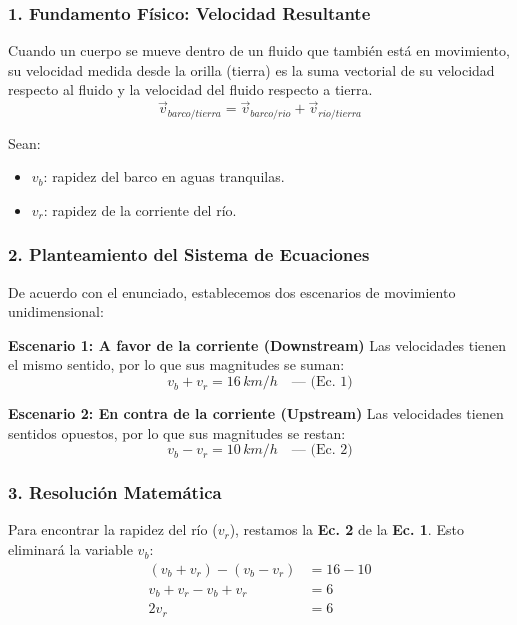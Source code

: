 \documentclass[12pt, a4paper]{article}
\begin{document}
\subsubsection*{1. Fundamento Físico: Velocidad Resultante}

Cuando un cuerpo se mueve dentro de un fluido que también está en movimiento, su velocidad medida desde la orilla (tierra) es la suma vectorial de su velocidad respecto al fluido y la velocidad del fluido respecto a tierra.
\begin{equation}
    \vec{v}_{barco/tierra} = \vec{v}_{barco/rio} + \vec{v}_{rio/tierra}
\end{equation}

Sean:
\begin{itemize}
    \item $v_b$: rapidez del barco en aguas tranquilas.
    \item $v_r$: rapidez de la corriente del río.
\end{itemize}

\subsubsection*{2. Planteamiento del Sistema de Ecuaciones}

De acuerdo con el enunciado, establecemos dos escenarios de movimiento unidimensional:

\textbf{Escenario 1: A favor de la corriente (Downstream)}
Las velocidades tienen el mismo sentido, por lo que sus magnitudes se suman:
\begin{equation}
    v_b + v_r = 16 \, \si{km/h} \quad \text{--- (Ec. 1)}
\end{equation}

\textbf{Escenario 2: En contra de la corriente (Upstream)}
Las velocidades tienen sentidos opuestos, por lo que sus magnitudes se restan:
\begin{equation}
    v_b - v_r = 10 \, \si{km/h} \quad \text{--- (Ec. 2)}
\end{equation}

\subsubsection*{3. Resolución Matemática}

Para encontrar la rapidez del río ($v_r$), restamos la \textbf{Ec. 2} de la \textbf{Ec. 1}. Esto eliminará la variable $v_b$:
\begin{align*}
    (v_b + v_r) - (v_b - v_r) &= 16 - 10 \\
    v_b + v_r - v_b + v_r &= 6 \\
    2v_r &= 6
\end{align*}
\end{document}
